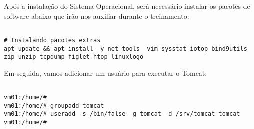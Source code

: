 Após a instalação do Sistema Operacional, será necessário instalar os pacotes de software abaixo que irão nos auxiliar durante o treinamento:

\begin{lstlisting}[breaklines=true,basicstyle=\firacoderetina,breaklines=true,
caption=\firacoderetina Instalando pacotes extras, postbreak=\mbox{\textcolor{red}{$\hookrightarrow$}\space},
showstringspaces=false]

# Instalando pacotes extras
apt update && apt install -y net-tools  vim sysstat iotop bind9utils zip unzip tcpdump figlet htop linuxlogo

\end{lstlisting}


Em seguida, vamos adicionar um usuário para executar o Tomcat:

\begin{lstlisting}[breaklines=true,basicstyle=\firacoderetina,
breaklines=true,caption=\firacoderetina Criando usuário e grupo,
postbreak=\mbox{\textcolor{red}{$\hookrightarrow$}\space},
showstringspaces=false]

vm01:/home/# 		
vm01:/home/# groupadd tomcat		
vm01:/home/# useradd -s /bin/false -g tomcat -d /srv/tomcat tomcat
vm01:/home/# 		

\end{lstlisting}
